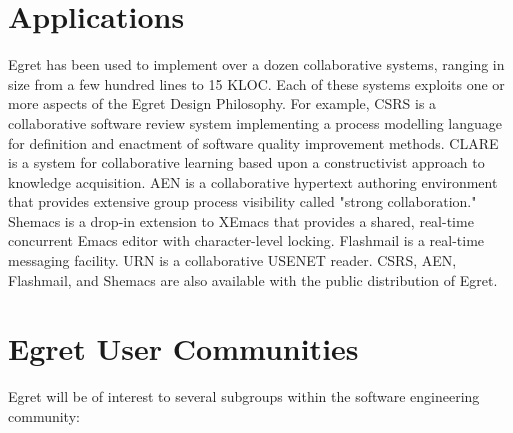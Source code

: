 \section{Applications}

Egret has been used to implement over a dozen collaborative systems,
ranging in size from a few hundred lines to 15 KLOC.  Each of these systems
exploits one or more aspects of the Egret Design Philosophy. For example,
CSRS is a collaborative software review system implementing a process
modelling language for definition and enactment of software quality
improvement methods.  CLARE is a system for collaborative learning based
upon a constructivist approach to knowledge acquisition. AEN is a
collaborative hypertext authoring environment that provides extensive group
process visibility called "strong collaboration."  Shemacs is a drop-in
extension to XEmacs that provides a shared, real-time concurrent Emacs
editor with character-level locking. Flashmail is a real-time messaging
facility.  URN is a collaborative USENET reader.  CSRS, AEN, Flashmail, and
Shemacs are also available with the public distribution of Egret.

\section{Egret User Communities}

Egret will be of interest to several subgroups within the software engineering community:

